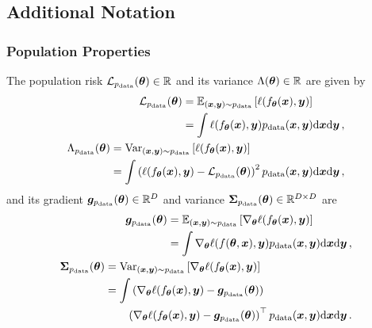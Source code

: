 \subsection{Additional Notation}\label{cockpit::app:notation}

\subsubsection{Population Properties}

The population risk ${\mathcal{L}}_{p_{\mathrm{data}}}({\bm{\theta}}) \in {\mathbb{R}}$ and its variance
$\Lambda({\bm{\theta}}) \in {\mathbb{R}}$ are given by
\begin{subequations}
  \begin{align}
    \begin{split}\label{cockpit::eq:population-risk}
      {\mathcal{L}}_{p_{\mathrm{data}}}({\bm{\theta}})
      &= \mathbb{E}_{({\bm{x}}, {\bm{y}})\sim p_{\mathrm{data}}}\left[
        \ell(f_{{\bm{\theta}}}({\bm{x}}), {\bm{y}})
        \right]
      \\
      &= \int \ell(f_{{\bm{\theta}}}({\bm{x}}), {\bm{y}}) p_{\mathrm{data}}({\bm{x}}, {\bm{y}})\mathrm{d}{\bm{x}}\mathrm{d}{\bm{y}}\,,
      \\
    \end{split}
    \\
    \begin{split}\label{cockpit::eq:population-risk-variance}
      \Lambda_{p_{\mathrm{data}}}({\bm{\theta}})
      &=
        \mathrm{Var}_{({\bm{x}}, {\bm{y}})\sim p_{\mathrm{data}}}\left[
        \ell(f_{{\bm{\theta}}}({\bm{x}}), {\bm{y}})
        \right]
      \\
      &= \int \left(
        \ell(f_{{\bm{\theta}}}({\bm{x}}), {\bm{y}}) - {\mathcal{L}}_{p_{\mathrm{data}}}({\bm{\theta}})
        \right)^2
        p_{\mathrm{data}}({\bm{x}}, {\bm{y}}) \mathrm{d}{\bm{x}}\mathrm{d}{\bm{y}}\,,
    \end{split}
  \end{align}
\end{subequations}
and its gradient ${\bm{g}}_{p_{\mathrm{data}}}({\bm{\theta}}) \in {\mathbb{R}}^{D}$ and variance
${\bm{\Sigma}}_{p_{\mathrm{data}}}({\bm{\theta}}) \in {\mathbb{R}}^{D\times D}$ are
\begin{subequations}
  \begin{align}
    \begin{split}\label{cockpit::eq:population-gradient}
      {\bm{g}}_{p_{\mathrm{data}}}({\bm{\theta}})
      &= \mathbb{E}_{({\bm{x}}, {\bm{y}})\sim p_{\mathrm{data}}}\left[
        \nabla_{\bm{\theta}}
        \ell(f_{{\bm{\theta}}}({\bm{x}}), {\bm{y}})
        \right]
      \\
      &= \int \nabla_{\bm{\theta}}\ell(f({\bm{\theta}}, {\bm{x}}), {\bm{y}})
        p_{\mathrm{data}}({\bm{x}}, {\bm{y}})\mathrm{d}{\bm{x}}\mathrm{d}{\bm{y}}\,,
    \end{split}
    \\
    \begin{split}\label{cockpit::eq:population-gradient-variance}
      {\bm{\Sigma}}_{p_{\mathrm{data}}}({\bm{\theta}})
      &=
        \mathrm{Var}_{({\bm{x}}, {\bm{y}})\sim p_{\mathrm{data}}}\left[
        \nabla_{\bm{\theta}} \ell(f_{{\bm{\theta}}}({\bm{x}}), {\bm{y}})
        \right]
      \\
      &=
        \int \left(
        \nabla_{\bm{\theta}}\ell(f_{{\bm{\theta}}}({\bm{x}}), {\bm{y}}) - {\bm{g}}_{p_{\mathrm{data}}}({\bm{\theta}})
        \right)
      \\
      &\qquad
        \left( \nabla_{\bm{\theta}}\ell(f_{{\bm{\theta}}}({\bm{x}}), {\bm{y}}) - {\bm{g}}_{p_{\mathrm{data}}}({\bm{\theta}}) \right)^\top
        p_{\mathrm{data}}({\bm{x}}, {\bm{y}}) \mathrm{d}{\bm{x}}\mathrm{d}{\bm{y}}\,.
    \end{split}
  \end{align}
\end{subequations}

